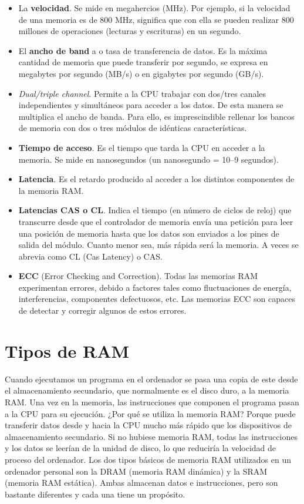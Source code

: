 \documentclass[11pt]{article}
\begin{document}
\begin{itemize}
\item La \textbf{velocidad}. Se mide en megahercios (MHz). Por ejemplo, si la velocidad de
una memoria es de 800 MHz, significa que con ella se pueden realizar 800
millones de operaciones (lecturas y escrituras) en un segundo.
\item El \textbf{ancho de band} a o tasa de transferencia de datos. Es la máxima cantidad de
memoria que puede transferir por segundo, se expresa en megabytes por segundo
(MB/s) o en gigabytes por segundo (GB/s).
\item \emph{Dual/triple channel}. Permite a la CPU trabajar con dos/tres canales
independientes y simultáneos para acceder a los datos. De esta manera se
multiplica el ancho de banda. Para ello, es imprescindible rellenar los
bancos de memoria con dos o tres módulos de idénticas características.
\item \textbf{Tiempo de acceso}. Es el tiempo que tarda la CPU en acceder a la memoria. Se
mide en nanosegundos (un nanosegundo = 10–9 segundos).
\item \textbf{Latencia}. Es el retardo producido al acceder a los distintos componentes de la memoria RAM.
\item \textbf{Latencias CAS o CL}. Indica el tiempo (en número de ciclos de reloj) que
transcurre desde que el controlador de memoria envía una petición para leer
una posición de  memoria hasta que los datos son enviados a los pines de
salida del módulo. Cuanto menor sea, más rápida será la memoria. A veces se
abrevia como CL (Cas Latency) o CAS.
\item \textbf{ECC} (Error Checking and Correction). Todas las memorias RAM experimentan
errores, debido a factores tales como fluctuaciones de energía,
interferencias, componentes defectuosos, etc. Las memorias ECC son capaces de
detectar y corregir algunos de estos errores.
\end{itemize}


\section{Tipos de RAM}
\label{sec:org6667c5e}

Cuando ejecutamos un programa en el ordenador se pasa una copia de este desde
el almacenamiento secundario, que normalmente es el disco duro, a la memoria
RAM. Una vez en la memoria, las instrucciones que componen el programa pasan
a la CPU para su ejecución. ¿Por qué se utiliza la memoria RAM? Porque puede transferir datos desde y hacia la CPU mucho más rápido que los dispositivos de almacenamiento secundario. Si no hubiese memoria RAM, todas las instrucciones y los
datos se leerían de la unidad de disco, lo que reduciría la velocidad de
proceso del ordenador.
Los dos tipos básicos de memoria RAM utilizados en un ordenador personal son
la DRAM (memoria RAM dinámica) y la SRAM (memoria RAM estática). Ambas
almacenan datos e instrucciones, pero son bastante diferentes y cada una tiene un
propósito.
\end{document}
